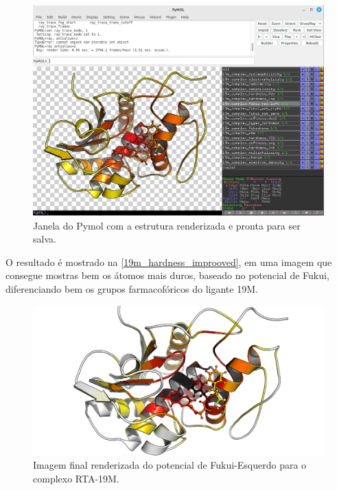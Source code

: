 \documentclass[a4paper,11pt]{refart}
\begin{document}
	\hspace*{-\leftmarginwidth}
	\begin{minipage}{\fullwidth}
		\begin{figure}[H]
			\begin{center}
				\includegraphics[width=5in]{19m_ray}
				\caption{Janela do Pymol com a estrutura renderizada e pronta para ser salva.}
				\label{19m_ray.}
			\end{center}
		\end{figure}
	\end{minipage}

	O resultado é mostrado na \autoref{19m_hardness_improoved}, em uma imagem que consegue mostras bem os átomos mais duros, baseado no potencial de Fukui, diferenciando bem os grupos farmacofóricos do ligante 19M.  
	
	\hspace*{-\leftmarginwidth}
	\begin{minipage}{\fullwidth}
		\begin{figure}[H]
			\begin{center}
				\includegraphics[width=5in]{19m_hardness_improoved}
				\caption{Imagem final renderizada do potencial de Fukui-Esquerdo para o complexo RTA-19M.}
				\label{19m_hardness_improoved}
			\end{center}
		\end{figure}
	\end{minipage}
\end{document}
